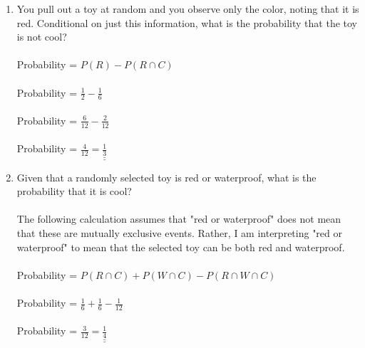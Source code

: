 \documentclass[12pt,a4paper]{article}
\numberwithin{equation}{subsection}
\def\doubleunderline#1{\underline{\underline{#1}}}
\begin{document}
\begin{enumerate}
\begin{enumerate}
\item You pull out a toy at random and you observe only the color, noting that it is red.  Conditional on just this information, what is the probability that the toy is not cool? \\ \\
Probability = $P(R) - P(R \cap C)$ \\ \\
Probability = $\frac{1}{2} - \frac{1}{6}$ \\ \\
Probability = $\frac{6}{12} - \frac{2}{12}$ \\ \\
Probability = $\frac{4}{12} = \doubleunderline{\frac{1}{3}}$ \\

\item Given that a randomly selected toy is red or waterproof, what is the probability that it is cool? \\ \\
The following calculation assumes that "red or waterproof" does not mean that these are mutually exclusive events.  Rather, I am interpreting "red or waterproof" to mean that the selected toy can be both red and waterproof. \\ \\
Probability = $P(R \cap C) + P(W \cap C) - P(R \cap W \cap C)$ \\ \\
Probability = $\frac{1}{6} + \frac{1}{6} - \frac{1}{12}$ \\ \\
Probability = $\frac{3}{12} = \doubleunderline{\frac{1}{4}}$
\end{enumerate}
 


\end{enumerate}
\end{document}

